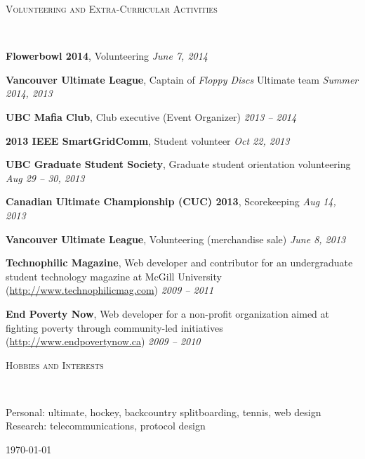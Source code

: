 \documentclass[10pt]{article}
\newenvironment{changemargin}[2]{%
  \begin{list}{}{%
    \setlength{\topsep}{0pt}%
    \setlength{\leftmargin}{#1}%
    \setlength{\rightmargin}{#2}%
    \setlength{\listparindent}{\parindent}%
    \setlength{\itemindent}{\parindent}%
    \setlength{\parsep}{\parskip}%
  }%
  \item[]}{\end{list}
}
\newcommand{\lineover}{
  \begin{changemargin}{-0.05in}{-0.05in}
    \vspace*{-8pt}
    \hrulefill \\
    \vspace*{-2pt}
  \end{changemargin}
}
\renewcommand{\section}[1]{
  \begin{changemargin}{-0.5in}{-0.5in}
    \normalsize \scshape{#1}\\
    \lineover
  \end{changemargin}
}
\newenvironment{body} {
  \vspace{2pt}
  \begin{changemargin}{-0.25in}{-0.5in}
    }{
  \end{changemargin}
}
\newcommand{\itemdescription}[3]{
  \textbf{#1}, {#2} \hfill \emph{#3}\\
  \medskip
}
\begin{document}
\section{Volunteering and Extra-Curricular Activities}
\begin{body}
\itemdescription{Flowerbowl 2014}{Volunteering}{June 7, 2014}
\itemdescription{Vancouver Ultimate League}{Captain of \emph{Floppy Discs}
Ultimate team}{Summer 2014, 2013}
\itemdescription{UBC Mafia Club}{Club executive (Event Organizer)}{2013 -- 
2014}
\itemdescription{2013 IEEE SmartGridComm}{Student volunteer}{Oct 22, 2013}
\itemdescription{UBC Graduate Student Society}{Graduate student orientation
volunteering}{Aug 29 -- 30, 2013}
\itemdescription{Canadian Ultimate Championship (CUC) 2013}{Scorekeeping}{Aug
14, 2013}
\itemdescription{Vancouver Ultimate League}{Volunteering (merchandise
sale)}{June 8, 2013}
\itemdescription{Technophilic Magazine}{Web developer and contributor for an
undergraduate student technology magazine at McGill University
(\url{http://www.technophilicmag.com})}{2009 -- 2011}
\itemdescription{End Poverty Now}{Web developer for a non-profit organization 
aimed at fighting poverty through community-led initiatives
(\url{http://www.endpovertynow.ca})}{2009 -- 2010}
\end{body}
\medskip

\section{Hobbies and Interests}
\begin{body}
Personal: ultimate, hockey, backcountry splitboarding, tennis, web design \\
Research: telecommunications, protocol design
\end{body}

\vfill \hfill \today
\end{document}
